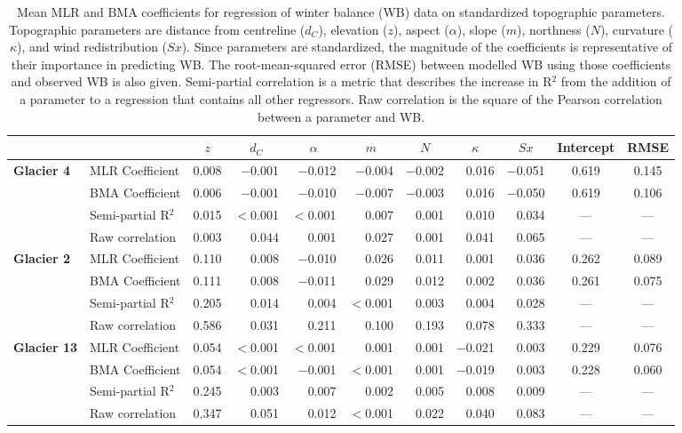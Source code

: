 \documentclass{sfuthesis}
\newcommand{\params}{Topographic parameters are distance from centreline ($d_C$), elevation ($z$), aspect ($\alpha$), slope ($m$), northness ($N$), curvature ($\kappa$), and wind redistribution ($Sx$). }
\begin{document}
\begin{table}
\centering
\caption{Mean MLR and BMA coefficients for regression of winter balance (WB) data on standardized topographic parameters. \params  Since parameters are standardized, the magnitude of the coefficients is representative of their importance in predicting WB. The root-mean-squared error (RMSE) between modelled WB using those coefficients and observed WB is also given. Semi-partial correlation is a metric that describes the increase in R$^2$ from the addition of a parameter to a regression that contains all other regressors. Raw correlation is the square of the Pearson correlation between a parameter and WB.}
\label{tab:MLRmeancoeff}
\begin{tabular}{ll|rrrrrrrc|c}
 &  & \multicolumn{1}{c}{$z$} & \multicolumn{1}{c}{$d_C$} & \multicolumn{1}{c}{$\alpha$} & \multicolumn{1}{c}{$m$} & \multicolumn{1}{c}{$N$} & \multicolumn{1}{c}{$\kappa$} & \multicolumn{1}{c}{$Sx$} & Intercept & RMSE \\ \hline \hline
\multirow{4}{*}{\textbf{Glacier 4}} & MLR Coefficient & 0.008 & $-$0.001 & $-$0.012 & $-$0.004 & $-$0.002 & 0.016 & $-$0.051 & 0.619 & 0.145 \\
 & BMA Coefficient & 0.006 & $-$0.001 & $-$0.010 & $-$0.007 & $-$0.003 & 0.016 & $-$0.050 & 0.619 & 0.106 \\
 & Semi-partial R$^2$ & 0.015 & $<$0.001 & $<$0.001 & 0.007 & 0.001 & 0.010 & 0.034 & --- & --- \\
 & Raw correlation & 0.003 & 0.044 & 0.001 & 0.027 & 0.001 & 0.041 & 0.065 & --- & --- \\ \hline
\multirow{4}{*}{\textbf{Glacier 2}} & MLR Coefficient & 0.110 & 0.008 & $-$0.010 & 0.026 & 0.011 & 0.001 & 0.036 & 0.262 & 0.089 \\
 & BMA Coefficient & 0.111 & 0.008 & $-$0.011 & 0.029 & 0.012 & 0.002 & 0.036 & 0.261 & 0.075 \\
 & Semi-partial R$^2$ & 0.205 & 0.014 & 0.004 & $<$0.001 & 0.003 & 0.004 & 0.028 & --- & --- \\
 & Raw correlation & 0.586 & 0.031 & 0.211 & 0.100 & 0.193 & 0.078 & 0.333 & --- & --- \\ \hline
\multirow{4}{*}{\textbf{Glacier 13}} & MLR Coefficient & 0.054 & $<$0.001 & $<$0.001 & 0.001 & 0.001 & $-$0.021 & 0.003 & 0.229 & 0.076 \\
 & BMA Coefficient & 0.054 & $<$0.001 & $-$0.001 & $<$0.001 & 0.001 & $-$0.019 & 0.003 & 0.228 & 0.060 \\
 & Semi-partial R$^2$ & 0.245 & 0.003 & 0.007 & 0.002 & 0.005 & 0.008 & 0.009 & --- & --- \\
 & Raw correlation & 0.347 & 0.051 & 0.012 & $<$0.001 & 0.022 & 0.040 & 0.083 & --- & ---
\end{tabular}
\end{table}
\end{document}
